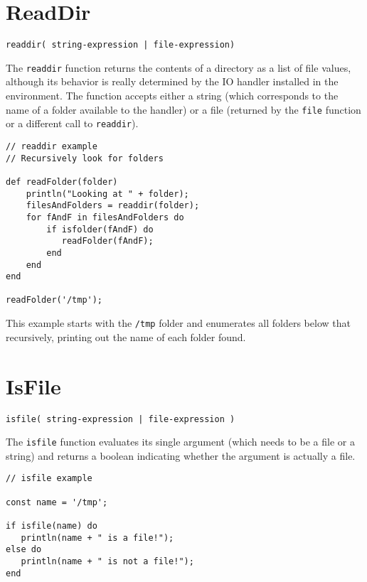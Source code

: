 \section{ReadDir}

\begin{Verbatim}
readdir( string-expression | file-expression)
\end{Verbatim}

The \Verb+readdir+ function returns the contents of a directory as a list of file values, although its behavior is really determined by the IO handler installed in the \Reflex environment. The function accepts either a string (which corresponds to the name of a folder available to the handler) or a file (returned by the \verb+file+ function or a different call to \verb+readdir+).

\begin{lstlisting}[caption={readdir example}]
// readdir example
// Recursively look for folders

def readFolder(folder)
    println("Looking at " + folder);
    filesAndFolders = readdir(folder);
    for fAndF in filesAndFolders do
        if isfolder(fAndF) do
           readFolder(fAndF);
        end
    end
end

readFolder('/tmp');

\end{lstlisting}

This example starts with the \Verb+/tmp+ folder and enumerates all folders below that recursively, printing out the name of each folder found.

\section{IsFile}

\begin{Verbatim}
isfile( string-expression | file-expression )
\end{Verbatim}

The \Verb+isfile+ function evaluates its single argument (which needs to be a file or a string) and returns a boolean indicating whether the argument is actually a file.

\begin{lstlisting}[caption={IsFile example}]
// isfile example

const name = '/tmp';

if isfile(name) do
   println(name + " is a file!");
else do
   println(name + " is not a file!");
end

\end{lstlisting}

